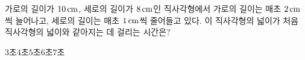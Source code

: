 가로의 길이가 $10\mkern3mu \mathrm{cm}$, 세로의 길이가 $8\mkern3mu \mathrm{cm}$인 직사각형에서 가로의 길이는 매초 $2\mkern3mu \mathrm{cm}$씩 늘어나고, 세로의 길이는 매초 $1\mkern3mu \mathrm{cm}$씩 줄어들고 있다. 이 직사각형의 넓이가 처음 직사각형의 넓이와 같아지는 데 걸리는 시간은?
\begin{choices32}{$3$초}{$4$초}{$5$초}{$6$초}{$7$초}\end{choices32}
